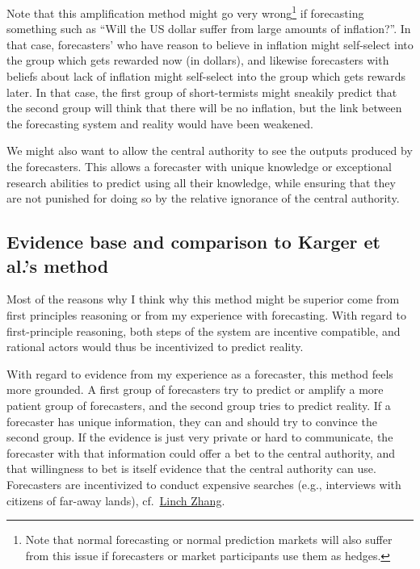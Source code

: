 \documentclass[]{article}
\begin{document}
Note that this amplification method might go very
wrong\footnote{Note that normal forecasting or normal prediction markets will also suffer from this issue if forecasters or market participants use them as hedges.}
if forecasting something such as ``Will the US dollar suffer from large
amounts of inflation?''. In that case, forecasters' who have reason to
believe in inflation might self-select into the group which gets
rewarded now (in dollars), and likewise forecasters with beliefs about
lack of inflation might self-select into the group which gets rewards
later. In that case, the first group of short-termists might sneakily
predict that the second group will think that there will be no
inflation, but the link between the forecasting system and reality would
have been weakened.

We might also want to allow the central authority to see the outputs
produced by the forecasters. This allows a forecaster with unique
knowledge or exceptional research abilities to predict using all their
knowledge, while ensuring that they are not punished for doing so by the
relative ignorance of the central authority.

\hypertarget{evidence-base-and-comparison-to-karger-et-al.s-method}{%
\subsection{Evidence base and comparison to Karger et al.'s
method}\label{evidence-base-and-comparison-to-karger-et-al.s-method}}

Most of the reasons why I think why this method might be superior come
from first principles reasoning or from my experience with forecasting.
With regard to first-principle reasoning, both steps of the system are
incentive compatible, and rational actors would thus be incentivized to
predict reality.

With regard to evidence from my experience as a forecaster, this method
feels more grounded. A first group of forecasters try to predict or
amplify a more patient group of forecasters, and the second group tries
to predict reality. If a forecaster has unique information, they can and
should try to convince the second group. If the evidence is just very
private or hard to communicate, the forecaster with that information
could offer a bet to the central authority, and that willingness to bet
is itself evidence that the central authority can use. Forecasters are
incentivized to conduct expensive searches (e.g., interviews with
citizens of far-away lands),
cf.~\href{https://twitter.com/LinchZhang/status/1455759586158268417}{Linch
Zhang}.
\end{document}
